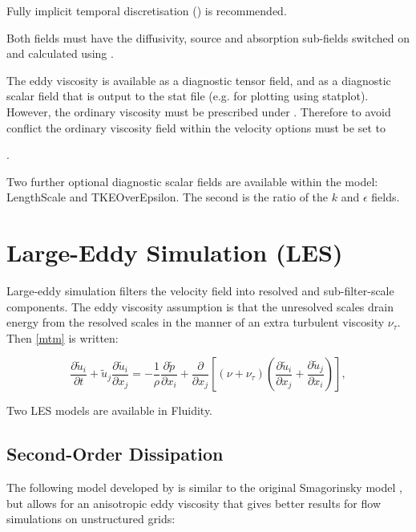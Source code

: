 Fully implicit temporal discretisation () is recommended.

Both fields must have the diffusivity, source and absorption sub-fields switched on and calculated using .

The eddy viscosity is available as a diagnostic tensor field, and as a diagnostic scalar field that is output to the stat file (e.g. for plotting using statplot). However, the ordinary viscosity must be prescribed under . Therefore to avoid conflict the ordinary viscosity field within the velocity options must be set to

.

Two further optional diagnostic scalar fields are available within the model: LengthScale and TKEOverEpsilon. The second is the ratio of the $k$ and $\epsilon$ fields.

\section{Large-Eddy Simulation (LES)}

Large-eddy simulation filters the velocity field into resolved and sub-filter-scale components. The eddy viscosity assumption is that the unresolved scales drain energy from the resolved scales in the manner of an extra turbulent viscosity $\nu_\tau$. Then \eqref{mtm} is written:

\begin{equation}
\frac{\partial \tilde u_i}{\partial t} + \tilde u_j \frac{\partial \tilde u_i}{\partial x_j}
 = -\frac 1 \rho \frac{\partial \tilde p}{\partial x_i}
 + \frac{\partial}{\partial x_j} \left [ (\nu + \nu_\tau) \left ( \frac{\partial \tilde u_i}{\partial x_j} + \frac{\partial \tilde u_j}{\partial x_i} \right ) \right ],
\end{equation}

Two LES models are available in Fluidity.

\subsection{Second-Order Dissipation}

The following model developed by \citet{bentham2003} is similar to the original Smagorinsky model \citep{smagorinsky1963general}, but allows for an anisotropic eddy viscosity that gives better results for flow simulations on unstructured grids:

